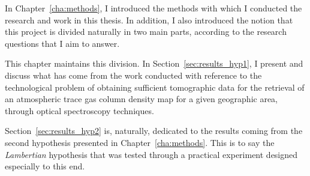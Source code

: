
In Chapter~\ref{cha:methods}, I introduced the methods with which I
conducted the research and work in this thesis. In addition, I also
introduced the notion that this project is divided naturally in two main
parts, according to the research questions that I aim to answer.

This chapter maintains this division. In Section~\ref{sec:results_hyp1},
I present and discuss what has come from the work conducted with
reference to the technological problem of obtaining sufficient
tomographic data for the retrieval of an atmospheric trace gas column
density map for a given geographic area, through optical spectroscopy
techniques.

Section~\ref{sec:results_hyp2} is, naturally, dedicated to the results
coming from the second hypothesis presented in
Chapter~\ref{cha:methods}. This is to say the \emph{Lambertian}
hypothesis that was tested through a practical experiment designed
especially to this end.
